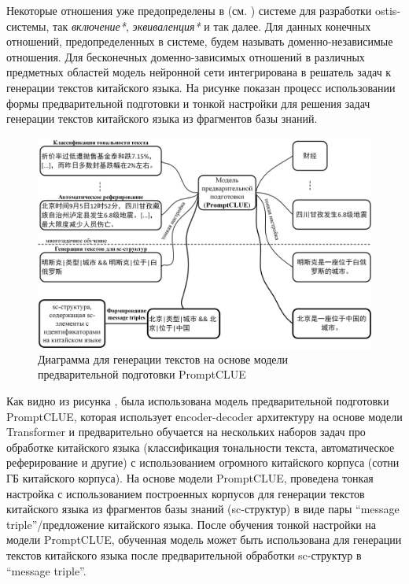 Некоторые отношения уже предопределены в  (см. ) системе для разработки ostis-системы, так \textit{включение*}, \textit{эквиваленция*} и так далее. Для данных конечных отношений, предопределенных в  системе, будем называть доменно-независимые отношения. Для бесконечных доменно-зависимых отношений в различных предметных областей модель нейронной сети интегрирована в решатель задач к генерации текстов китайского языка. На рисунке \textit{} показан процесс использовании формы предварительной подготовки и тонкой настройки для решения задач генерации текстов китайского языка из фрагментов базы знаний. 
\begin{figure}[H]
	\includegraphics[scale=0.8,width=1.0\textwidth]{images/part4/chapter_chinese/promptCLUE4SC.png}
	\caption{Диаграмма для генерации текстов на основе модели предварительной подготовки PromptCLUE}
	\label{fig:pre-training-model}
\end{figure}

Как видно из рисунка \textit{}, была использована модель предварительной подготовки PromptCLUE, которая использует еncoder-decoder архитектуру на основе модели Transformer и предварительно обучается на нескольких наборов задач про обработке китайского языка (классификация тональности текста, автоматическое реферирование и другие) с использованием огромного китайского корпуса (сотни ГБ китайского корпуса).  На основе модели PromptCLUE, проведена тонкая настройка с использованием построенных корпусов для генерации текстов китайского языка из фрагментов базы знаний (sc-структур) в виде пары ``message triple''/предложение китайского языка. После обучения тонкой настройки на модели PromptCLUE, обученная модель может быть использована для генерации текстов китайского языка после предварительной обработки sc-структур в ``message triple''. 

